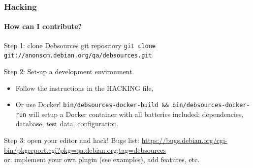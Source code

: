 \documentclass{beamer}
\begin{document}
\begin{frame}
  \frametitle{Hacking}
  \framesubtitle{How can I contribute?}
  \begin{block}{Step 1: clone Debsources git repository}
    \texttt{git clone git://anonscm.debian.org/qa/debsources.git}
  \end{block}
  \pause
  \begin{block}{Step 2: Set-up a development environment}
    \begin{itemize}
    \item Follow the instructions in the \alert{HACKING} file,
    \item Or use Docker!
      \texttt{bin/debsources-docker-build \&\& bin/debsources-docker-run}
      will setup a \alert{Docker container} with all batteries included:
      dependencies, database, test data, configuration.
    \end{itemize}
  \end{block}
  \pause
  \begin{block}{Step 3: open your editor and hack!}
    \alert{Bugs list}:
    \url{https://bugs.debian.org/cgi-bin/pkgreport.cgi?pkg=qa.debian.org;tag=debsources}
    \\
    or: implement your own \alert{plugin} (see examples), add \alert{features}, etc.
  \end{block}
\end{frame}

\background

\begin{frame}[plain]
\end{frame}
\end{document}
